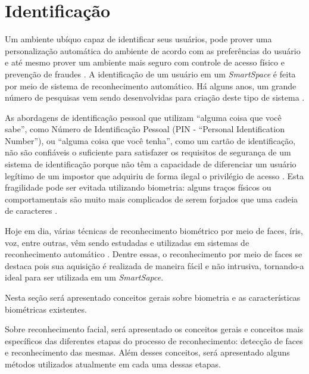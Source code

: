 	
	

	

\section{Identificação}

	Um ambiente ubíquo capaz de identificar seus usuários, pode prover uma personalização automática do ambiente de acordo com as preferências do usuário e até mesmo prover um ambiente mais seguro com controle de acesso físico e prevenção de fraudes \cite{saocarlos}. A identificação de um usuário em um \textit{SmartSpace} é feita por meio de sistema de reconhecimento automático. Há alguns anos, um grande número de pesquisas vem sendo desenvolvidas para criação deste tipo de sistema  \cite{saocarlos}. 

	As abordagens de identificação pessoal que utilizam ``alguma coisa que você sabe'', como Número de Identificação Pessoal (PIN - ``Personal Identification Number''), ou ``alguma coisa que você tenha'', como um cartão de identificação, não são confiáveis o suficiente para satisfazer os requisitos de segurança de um sistema de identificação porque não têm a capacidade de diferenciar um usuário legítimo de um impostor que adquiriu de forma ilegal o privilégio de acesso \cite{hong}. Esta fragilidade pode ser evitada utilizando biometria: alguns traços físicos ou comportamentais são muito mais complicados de serem forjados que uma cadeia de caracteres \cite{drovetto}. 

	Hoje em dia, várias técnicas de reconhecimento biométrico por meio de faces, íris, voz, entre outras, vêm sendo estudadas e utilizadas em sistemas de reconhecimento automático \cite{bolle}. Dentre essas, o reconhecimento por meio de faces se destaca pois sua aquisição é realizada de maneira fácil e não intrusiva, tornando-a ideal para ser utilizada em um \textit{SmartSapce}.

	Nesta seção será apresentado conceitos gerais sobre biometria e as características biométricas existentes.

	Sobre reconhecimento facial, será apresentado os conceitos gerais e conceitos mais específicos das diferentes etapas do processo de reconhecimento: detecção de faces e reconhecimento das mesmas. Além desses conceitos, será apresentado alguns métodos utilizados atualmente em cada uma dessas etapas.


	
	






























